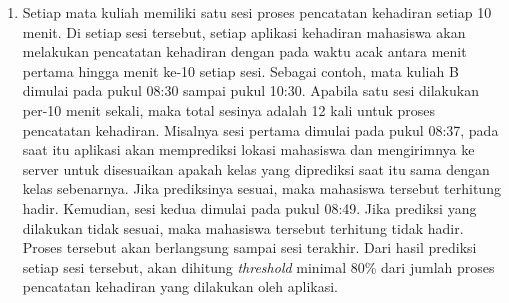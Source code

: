 \begin{enumerate}[a.]
\begin{enumerate}[1.]
		            \vspace{2cm}
		      \item Setiap mata kuliah memiliki satu sesi proses pencatatan kehadiran setiap 10 menit. Di setiap sesi tersebut, setiap aplikasi kehadiran mahasiswa akan melakukan pencatatan kehadiran dengan pada waktu acak antara menit pertama hingga menit ke-10 setiap sesi. Sebagai contoh, mata kuliah B dimulai pada pukul 08:30 sampai pukul 10:30. Apabila satu sesi dilakukan per-10 menit sekali, maka total sesinya adalah 12 kali untuk proses pencatatan kehadiran. Misalnya sesi pertama dimulai pada pukul 08:37, pada saat itu aplikasi akan memprediksi lokasi mahasiswa dan mengirimnya ke server untuk disesuaikan apakah kelas yang diprediksi saat itu sama dengan kelas sebenarnya. Jika prediksinya sesuai, maka mahasiswa tersebut terhitung hadir. Kemudian, sesi kedua dimulai pada pukul 08:49. Jika prediksi yang dilakukan tidak sesuai, maka mahasiswa tersebut terhitung tidak hadir. Proses tersebut akan berlangsung sampai sesi terakhir. Dari hasil prediksi setiap sesi tersebut, akan dihitung \textit{threshold} minimal 80\% dari jumlah proses pencatatan kehadiran yang dilakukan oleh aplikasi.
	      \end{enumerate}


\end{enumerate}
